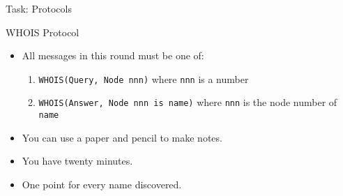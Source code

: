 \documentclass[svgnames]{beamer}
\begin{document}
\begin{frame}{Task: Protocols}
\begin{block}{WHOIS Protocol}
\begin{itemize}
\item All messages in this round must be one of:
\begin{enumerate}
\item \texttt{WHOIS(Query, Node nnn)} where \texttt{nnn} is a number
\item \texttt{WHOIS(Answer, Node nnn is name)} where \texttt{nnn} is the node number of \texttt{name}
\end{enumerate}
\item You can use a paper and pencil to make notes.
\item You have twenty minutes.
\item One point for every name discovered.
\end{itemize}
\end{block}
\end{frame}
\end{document}
